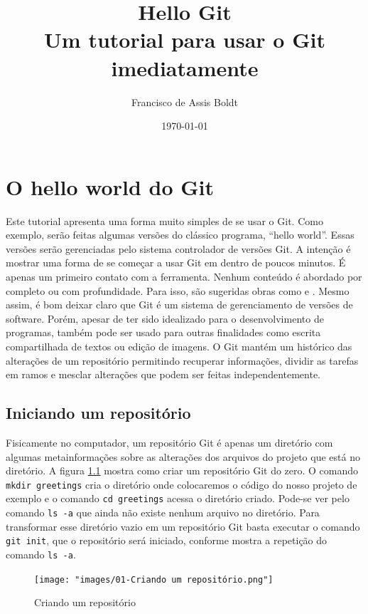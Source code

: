 \documentclass[a4paper]{book}
\title{Hello Git\\
\large Um tutorial para usar o Git imediatamente}
\author{Francisco de Assis Boldt}
\date{\today}
\begin{document}
  
\maketitle
  
\tableofcontents

\chapter{O hello world do Git}

Este tutorial apresenta uma forma muito simples de se usar o Git.
Como exemplo, serão feitas algumas versões do clássico programa, 
``hello world''. Essas versões serão gerenciadas pelo sistema 
controlador de versões Git.
A intenção é mostrar uma forma de se começar a usar Git em 
dentro de poucos minutos. É apenas um primeiro contato com a ferramenta.
Nenhum conteúdo é abordado por completo ou com profundidade.
Para isso, são sugeridas obras como \cite{hodson2014ry} e 
\cite{chacon2014pro}.
Mesmo assim, é bom deixar claro que Git é um sistema de
gerenciamento de versões de software.
Porém, apesar de ter sido idealizado para o desenvolvimento
de programas, também pode ser usado para outras finalidades
como escrita compartilhada de textos ou edição de imagens.
O Git mantém um histórico das alterações de um repositório 
permitindo recuperar informações, dividir as tarefas em ramos
e mesclar alterações que podem ser feitas independentemente.

\section{Iniciando um repositório}

Fisicamente no computador, um repositório Git é apenas um
diretório com algumas metainformações sobre as alterações 
dos arquivos do projeto que está no diretório.
A figura \ref{fig:01} mostra como criar um repositório Git
do zero. O comando \texttt{mkdir greetings} cria o diretório
onde colocaremos o código do nosso projeto de exemplo e o
comando \texttt{cd greetings}  acessa o diretório criado.
Pode-se ver pelo comando \texttt{ls -a} que ainda não existe
nenhum  arquivo no diretório. Para transformar esse diretório
vazio em um repositório Git basta executar o comando
\texttt{git init}, que o repositório será iniciado, conforme
mostra a repetição do comando \texttt{ls -a}.

\begin{figure}[ht]
\caption{Criando um repositório}
\label{fig:01}
\centering
\texttt{[image: "images/01-Criando um repositório.png"]}
\end{figure}
\end{document}
